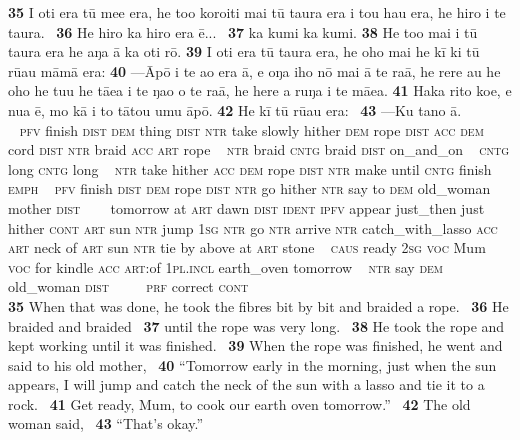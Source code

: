 {\bigskip\gll
\textbf{\textup{35}} I oti era tū me{\ꞌ}e era, he to{\ꞌ}o koro{\ꞌ}iti mai tū taura era i tou hau era, he hiro i te taura. ~\textbf{\textup{36}} He hiro ka hiro era ē... ~\textbf{\textup{37}} ka kumi ka kumi. \textbf{\textup{38}} He to{\ꞌ}o mai i tū taura era he aŋa {\ꞌ}ā ka oti rō. \textbf{\textup{39}} I oti era tū taura era, he oho mai he kī ki tū rū{\ꞌ}au māmā era: \textbf{\textup{40}} —\=Apō {\ꞌ}i te {\ꞌ}ao era {\ꞌ}ā, e oŋa iho nō mai {\ꞌ}ā te ra{\ꞌ}ā, he rere au he oho he tu{\ꞌ}u he tāea i te ŋao o te ra{\ꞌ}ā, he here a ruŋa i te mā{\ꞌ}ea. \textbf{\textup{41}} Haka rito koe, e nua ē, mo kā i to tātou {\ꞌ}umu āpō. \textbf{\textup{42}} He kī tū rū{\ꞌ}au era: ~\textbf{\textup{43}} —Ku tano {\ꞌ}ā.\\
~ \textsc{pfv} finish \textsc{dist} \textsc{dem} thing \textsc{dist} \textsc{ntr} take slowly hither \textsc{dem} rope \textsc{dist} \textsc{acc} \textsc{dem} cord \textsc{dist} \textsc{ntr} braid \textsc{acc} \textsc{art} rope ~ \textsc{ntr} braid \textsc{cntg} braid \textsc{dist} on\_and\_on ~ \textsc{cntg} long \textsc{cntg} long ~ \textsc{ntr} take hither \textsc{acc} \textsc{dem} rope \textsc{dist} \textsc{ntr} make until \textsc{cntg} finish \textsc{emph}  ~ \textsc{pfv} finish \textsc{dist} \textsc{dem} rope \textsc{dist} \textsc{ntr} go hither \textsc{ntr} say to \textsc{dem} old\_woman mother \textsc{dist} ~ ~~tomorrow at \textsc{art} dawn \textsc{dist} \textsc{ident} \textsc{ipfv} appear just\_then just hither \textsc{cont} \textsc{art} sun \textsc{ntr} jump \textsc{1sg} \textsc{ntr} go \textsc{ntr} arrive \textsc{ntr} catch\_with\_lasso \textsc{acc} \textsc{art} neck of \textsc{art} sun \textsc{ntr} tie by above at \textsc{art} stone ~ \textsc{caus} ready \textsc{2sg} \textsc{voc} Mum \textsc{voc} for kindle \textsc{acc} \textsc{art}:of \textsc{1pl.incl} earth\_oven tomorrow ~ \textsc{ntr} say \textsc{dem} old\_woman \textsc{dist} ~ ~~~\textsc{prf} correct \textsc{cont}\\
\newpage 
\glt
\textbf{\textup{35}} When that was done, he took the fibres bit by bit and braided a rope. ~\textbf{\textup{36}} He braided and braided ~\textbf{\textup{37}} until the rope was very long. ~\textbf{\textup{38}} He took the rope and kept working until it was finished. ~\textbf{\textup{39}} When the rope was finished, he went and said to his old mother, ~\textbf{\textup{40}} “Tomorrow early in the morning, just when the sun appears, I will jump and catch the neck of the sun with a lasso and tie it to a rock. ~\textbf{\textup{41}} Get ready, Mum, to cook our earth oven tomorrow.” ~\textbf{\textup{42}} The old woman said, ~\textbf{\textup{43}} “That’s okay.”


}
